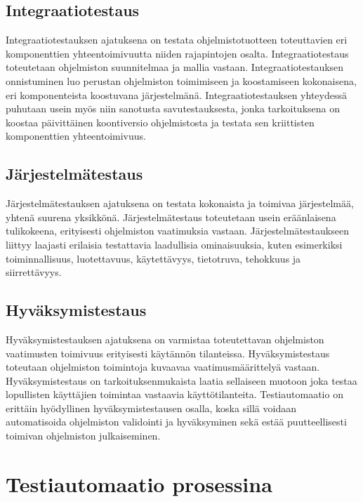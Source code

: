   \subsection{Integraatiotestaus}

  Integraatiotestauksen ajatuksena on testata ohjelmistotuotteen toteuttavien eri komponenttien yhteentoimivuutta niiden rajapintojen osalta.
  Integraatiotestaus toteutetaan ohjelmiston suunnitelmaa ja mallia vastaan.
  Integraatiotestauksen onnistuminen luo perustan ohjelmiston toimimiseen ja koostamiseen kokonaisena, eri komponenteista koostuvana järjestelmänä.
  Integraatiotestauksen yhteydessä puhutaan usein myös niin sanotusta savutestauksesta, jonka tarkoituksena on koostaa päivittäinen koontiversio ohjelmistosta ja testata sen kriittisten komponenttien yhteentoimivuus.

  \subsection{Järjestelmätestaus}

  Järjestelmätestauksen ajatuksena on testata kokonaista ja toimivaa järjestelmää, yhtenä suurena yksikkönä.
  Järjestelmätestaus toteutetaan usein eräänlaisena tulikokeena, erityisesti ohjelmiston vaatimuksia vastaan.
  Järjestelmätestaukseen liittyy laajasti erilaisia testattavia laadullisia ominaisuuksia, kuten esimerkiksi toiminnallisuus, luotettavuus, käytettävyys, tietotruva, tehokkuus ja siirrettävyys.

  \subsection{Hyväksymistestaus}

  Hyväksymistestauksen ajatuksena on varmistaa toteutettavan ohjelmiston vaatimusten toimivuus erityisesti käytännön tilanteissa.
  Hyväksymistestaus toteutaan ohjelmiston toimintoja kuvaavaa vaatimusmäärittelyä vastaan.
  Hyväksymistestaus on tarkoituksenmukaista laatia sellaiseen muotoon joka testaa lopullisten käyttäjien toimintaa vastaavia käyttötilanteita.
  Testiautomaatio on erittäin hyödyllinen hyväksymistestausen osalla, koska sillä voidaan automatisoida ohjelmiston validointi ja hyväksyminen sekä estää puutteellisesti toimivan ohjelmiston julkaiseminen.

\section{Testiautomaatio prosessina}


